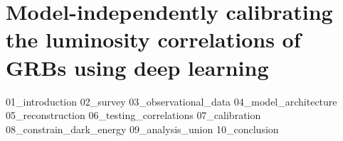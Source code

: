 \chapter{Model-independently calibrating the luminosity correlations of GRBs using deep learning}
{01_introduction}
{02_survey}
{03_observational_data}
{04_model_architecture}
{05_reconstruction}
{06_testing_correlations}
{07_calibration}
{08_constrain_dark_energy}
{09_analysis_union}
{10_conclusion}


